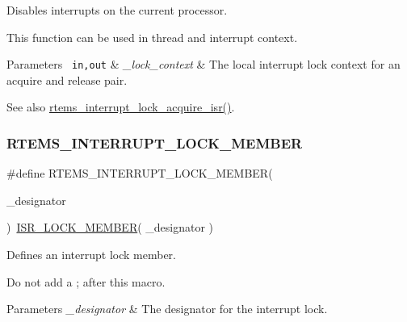 Disables interrupts on the current processor. 

This function can be used in thread and interrupt context.


\begin{DoxyParams}[1]{Parameters}
\mbox{\texttt{ in,out}}  & {\em \+\_\+lock\+\_\+context} & The local interrupt lock context for an acquire and release pair.\\
\hline
\end{DoxyParams}
\begin{DoxySeeAlso}{See also}
\mbox{\hyperlink{group__ClassicINTRLocks_gacd04eb0d7343b27b1c0c918c4330769c}{rtems\+\_\+interrupt\+\_\+lock\+\_\+acquire\+\_\+isr()}}. 
\end{DoxySeeAlso}
\mbox{\label{group__ClassicINTRLocks_ga26826ac7bf02ef651e67c386443beb0f}} 
\subsubsection{\texorpdfstring{RTEMS\_INTERRUPT\_LOCK\_MEMBER}{RTEMS\_INTERRUPT\_LOCK\_MEMBER}}
{\footnotesize\ttfamily \#define R\+T\+E\+M\+S\+\_\+\+I\+N\+T\+E\+R\+R\+U\+P\+T\+\_\+\+L\+O\+C\+K\+\_\+\+M\+E\+M\+B\+ER(\begin{DoxyParamCaption}\item[{}]{\+\_\+designator }\end{DoxyParamCaption})~\mbox{\hyperlink{group__RTEMSScoreISRLocks_ga09174e3121c9ec30b08d4ab09706833d}{I\+S\+R\+\_\+\+L\+O\+C\+K\+\_\+\+M\+E\+M\+B\+ER}}( \+\_\+designator )}



Defines an interrupt lock member. 

Do not add a \textquotesingle{};\textquotesingle{} after this macro.


\begin{DoxyParams}{Parameters}
{\em \+\_\+designator} & The designator for the interrupt lock. \\
\hline
\end{DoxyParams}
\mbox{\label{group__ClassicINTRLocks_ga3ca17a87f1b9beb929be89357a9a196d}} 
